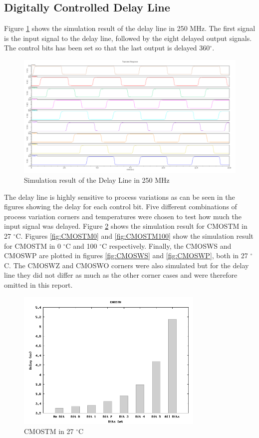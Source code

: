 \documentclass[a4paper,12pt]{article} \usepackage{graphicx}
\newcommand{\degree}{\ensuremath{^\circ}}
\begin{document}
\subsection{Digitally Controlled Delay Line}
Figure \ref{fig:delay_white} shows the simulation result of the delay line in
250 MHz. The first signal is the input signal to the delay line, followed by the
eight delayed output signals. The control bits has been set so that the last
output is delayed 360\degree . 
\begin{figure}[h]
        \centering
        \includegraphics[width=\textwidth]{../Bilder/Delay_Line/delay_trans_sim_white.png}
        \caption{Simulation result of the Delay Line in 250 MHz}
        \label{fig:delay_white}
\end{figure}

The delay line is highly sensitive to process variations as can be seen in the
figures showing the delay for each control bit. Five different combinations of process
variation corners and temperatures were chosen to test how much the input signal
was delayed. Figure \ref{fig:CMOSTM} shows the simulation result for CMOSTM
in 27 \degree C. Figures \ref{fig:CMOSTM0} and \ref{fig:CMOSTM100} show
the simulation result for CMOSTM in 0 \degree C and 100 \degree C respectively.
Finally, the CMOSWS and CMOSWP are plotted in figures \ref{fig:CMOSWS} and
\ref{fig:CMOSWP}, both in 27 \degree C. The CMOSWZ and CMOSWO corners were also
simulated but for the delay line they did not differ as much as the other corner
cases and were therefore omitted in this report.

\begin{figure}[h!]
        \centering
        \includegraphics[width=0.8\textwidth]{../Bilder/Delay_Line/CMOSTM.png}
        \caption{CMOSTM in 27 \degree C}
        \label{fig:CMOSTM}
\end{figure}
\end{document}
